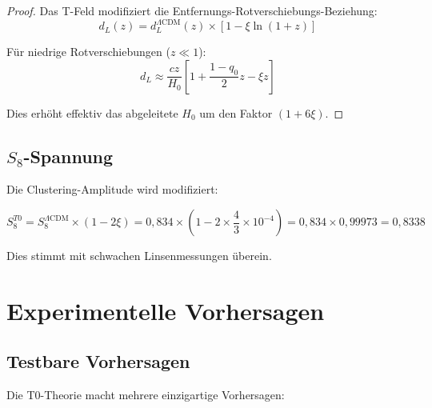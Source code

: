 \documentclass[12pt,a4paper]{article}
\newcommand{\xipar}{\xi}
\theoremstyle{definition}
\theoremstyle{remark}
\begin{document}
	\begin{proof}
		Das T-Feld modifiziert die Entfernungs-Rotverschiebungs-Beziehung:
		\begin{equation}
			d_L(z) = d_L^{\Lambda\text{CDM}}(z) \times \left[1 - \xipar \ln(1+z)\right]
		\end{equation}
		
		F\"ur niedrige Rotverschiebungen ($z \ll 1$):
		\begin{equation}
			d_L \approx \frac{cz}{H_0}\left[1 + \frac{1-q_0}{2}z - \xipar z\right]
		\end{equation}
		
		Dies erh\"oht effektiv das abgeleitete $H_0$ um den Faktor $(1 + 6\xipar)$.
	\end{proof}
	
	\subsection{$S_8$-Spannung}
	
	Die Clustering-Amplitude wird modifiziert:
	
	\begin{equation}
		S_8^{T0} = S_8^{\Lambda\text{CDM}} \times (1 - 2\xipar) = 0,834 \times (1 - 2 \times \frac{4}{3} \times 10^{-4}) = 0,834 \times 0,99973 = 0,8338
	\end{equation}
	
	Dies stimmt mit schwachen Linsenmessungen \"uberein.
	
	\section{Experimentelle Vorhersagen}
	\label{sec:predictions}
	
	\subsection{Testbare Vorhersagen}
	
	Die T0-Theorie macht mehrere einzigartige Vorhersagen:
	
\end{document}
